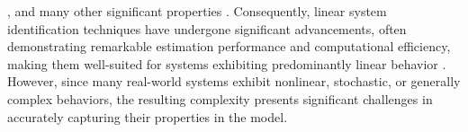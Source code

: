 \cite{khosravi2021FDI,marconato2016filter}, 
and many other significant properties \cite{risuleo2019bayesian,everitt2018empirical}.
%
Consequently, linear system identification techniques have undergone significant advancements, often demonstrating remarkable estimation performance and computational efficiency, making them well-suited for systems exhibiting predominantly linear behavior \cite{aastrom1971system,orlov2003adaptive}.
%
However, since many real-world systems exhibit nonlinear, stochastic, or generally complex behaviors, the resulting complexity presents significant challenges in accurately capturing their properties in the model.
%
